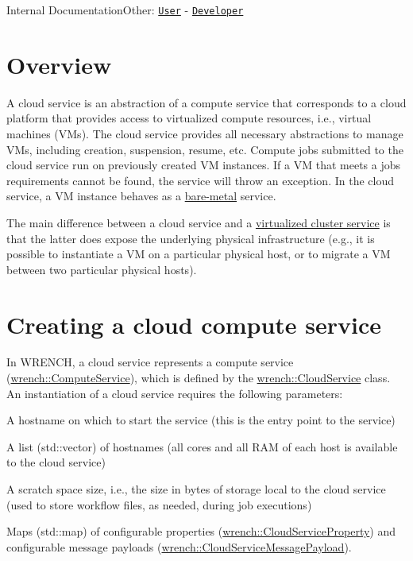Internal DocumentationOther\+: \href{../user/guide-cloud.html}{\tt User} -\/ \href{../developer/guide-cloud.html}{\tt Developer}\hypertarget{guide-cloud_guide-cloud-overview}{}\section{Overview}\label{guide-cloud_guide-cloud-overview}
A cloud service is an abstraction of a compute service that corresponds to a cloud platform that provides access to virtualized compute resources, i.\+e., virtual machines (V\+Ms). The cloud service provides all necessary abstractions to manage V\+Ms, including creation, suspension, resume, etc. Compute jobs submitted to the cloud service run on previously created VM instances. If a VM that meets a job\textquotesingle{}s requirements cannot be found, the service will throw an exception. In the cloud service, a VM instance behaves as a \hyperlink{guide-baremetal}{bare-\/metal} service.

The main difference between a cloud service and a \hyperlink{guide-virtualizedcluster}{virtualized cluster service} is that the latter does expose the underlying physical infrastructure (e.\+g., it is possible to instantiate a VM on a particular physical host, or to migrate a VM between two particular physical hosts).\hypertarget{guide-cloud_guide-cloud-creating}{}\section{Creating a cloud compute service}\label{guide-cloud_guide-cloud-creating}
In W\+R\+E\+N\+CH, a cloud service represents a compute service (\hyperlink{classwrench_1_1_compute_service}{wrench\+::\+Compute\+Service}), which is defined by the \hyperlink{classwrench_1_1_cloud_service}{wrench\+::\+Cloud\+Service} class. An instantiation of a cloud service requires the following parameters\+:


\begin{DoxyItemize}
\item A hostname on which to start the service (this is the entry point to the service)
\item A list ({\ttfamily std\+::vector}) of hostnames (all cores and all R\+AM of each host is available to the cloud service)
\item A scratch space size, i.\+e., the size in bytes of storage local to the cloud service (used to store workflow files, as needed, during job executions)
\item Maps ({\ttfamily std\+::map}) of configurable properties ({\ttfamily \hyperlink{classwrench_1_1_cloud_service_property}{wrench\+::\+Cloud\+Service\+Property}}) and configurable message payloads ({\ttfamily \hyperlink{classwrench_1_1_cloud_service_message_payload}{wrench\+::\+Cloud\+Service\+Message\+Payload}}).
\end{DoxyItemize}

